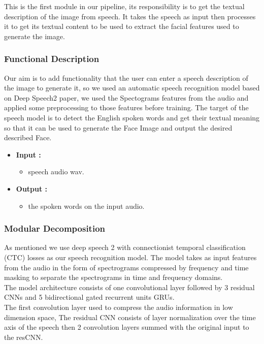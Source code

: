 This is the first module in our pipeline, its responsibility is to get the textual description of the image from speech. It takes the speech as input then processes it to get its textual content to be used to extract the facial features used to generate the image.

\subsubsection{Functional Description}

Our aim is to add functionality that the user can enter a speech description of the image to generate it, so we used an automatic speech recognition model based on Deep Speech2 paper, we used the Spectograms features from the audio and applied some preprocessing to those features before training. The target of the speech model is to detect the English spoken words and get their textual meaning so that it can be used to generate the Face Image and output the desired described Face.

\begin{itemize}
    \item \textbf{Input :}
    \begin{itemize}
        \item speech audio wav.
    \end{itemize}
    \item \textbf{Output :}
    \begin{itemize}
        \item the spoken words on the input audio.
    \end{itemize}
\end{itemize}

\subsubsection{Modular Decomposition}

As mentioned we use deep speech 2 with connectionist temporal classification (CTC) losses as our speech recognition model. The model takes as input features from the audio in the form of spectrograms compressed by frequency and time masking to separate the spectrograms in time and frequency domains. \\
The model architecture consists of one convolutional layer followed by 3 residual CNNs and 5 bidirectional gated recurrent units GRUs. \\

The first convolution layer used to compress the audio information in low dimension space, The residual CNN consists of layer normalization over the time axis of the speech then 2 convolution layers summed with the original input to the resCNN. \\

